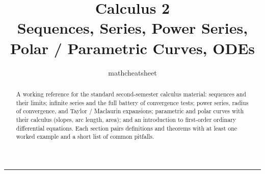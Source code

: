 \documentclass[11pt]{article}
\title{\textbf{Calculus 2}\\[2pt]\large Sequences, Series, Power Series, Polar / Parametric Curves, ODEs}
\author{mathcheatsheet}
\date{}
\begin{document}
\maketitle
\thispagestyle{empty}

\begin{abstract}
\noindent A working reference for the standard second-semester calculus material:
sequences and their limits; infinite series and the full battery of convergence
tests; power series, radius of convergence, and Taylor / Maclaurin expansions;
parametric and polar curves with their calculus (slopes, arc length, area);
and an introduction to first-order ordinary differential equations.
Each section pairs definitions and theorems with at least one worked example
and a short list of common pitfalls.
\end{abstract}

\tableofcontents
\bigskip\hrule\bigskip









\end{document}
